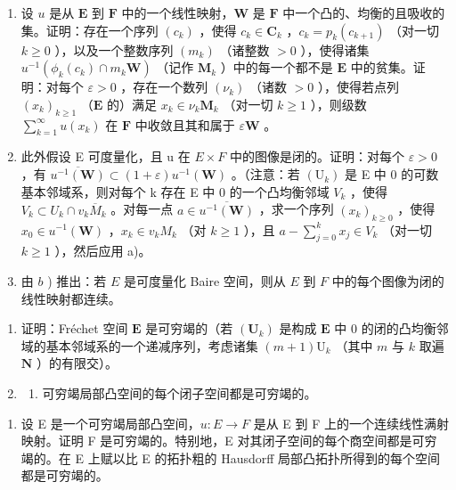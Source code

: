 \begin{enumerate}
\def\labelenumi{\alph{enumi})}
\item
  设 \(u\) 是从 \(\mathbf{E}\) 到 \(\mathbf{F}\) 中的一个线性映射，\(\mathbf{W}\) 是 \(\mathbf{F}\) 中一个凸的、均衡的且吸收的集。证明：存在一个序列 \((c_k)\) ，使得 \(c_k \in \mathbf{C}_k\) ，\(c_k = p_k(c_{k+1})\) （对一切 \(k \geqslant 0\) ），以及一个整数序列 \((m_k)\) （诸整数 \(> 0\) ），使得诸集 \(u^{-1}(\phi_k(c_k) \cap m_k\mathbf{W})\) （记作 \(\mathbf{M}_k\) ）中的每一个都不是 \(\mathbf{E}\) 中的贫集。证明：对每个 \(\varepsilon > 0\) ，存在一个数列 \((\nu_k)\) （诸数 \(> 0\) ），使得若点列 \((x_k)_{k \geqslant 1}\) （\(\mathbf{E}\) 的）满足 \(x_k \in \nu_k\mathbf{M}_k\) （对一切 \(k \geqslant 1\) ），则级数 \(\sum_{k=1}^{\infty} u(x_k)\) 在 \(\mathbf{F}\) 中收敛且其和属于 \(\varepsilon\mathbf{W}\) 。
\item
  此外假设 E 可度量化，且 u 在 \(E \times F\) 中的图像是闭的。证明：对每个 \(\varepsilon > 0\) ，有 \(\overline{u^{-1}(\mathbf{W})} \subset (1 + \varepsilon) u^{-1}(\mathbf{W})\) 。（注意：若 \((\mathrm{U}_{k})\) 是 E 中 0 的可数基本邻域系，则对每个 k 存在 E 中 0 的一个凸均衡邻域 \(V_{k}\) ，使得 \(V_{k} \subset U_{k} \cap v_{k} \overline{M}_{k}\) 。对每一点 \(a \in \overline{u^{-1}(\mathbf{W})}\) ，求一个序列 \((x_{k})_{k \geqslant 0}\) ，使得 \(x_{0} \in u^{-1}(\mathbf{W})\) ，\(x_{k} \in v_{k} M_{k}\) （对 \(k \geqslant 1\) ），且 \(a - \sum_{j=0}^{k} x_{j} \in V_{k}\) （对一切 \(k \geqslant 1\) ），然后应用 a)。
\item
  由 \(b\) ) 推出：若 \(E\) 是可度量化 Baire 空间，则从 \(E\) 到 \(F\) 中的每个图像为闭的线性映射都连续。
\end{enumerate}

\begin{enumerate}
\def\labelenumi{\arabic{enumi})}
\setcounter{enumi}{2}
\item
  证明：Fréchet 空间 \(\mathbf{E}\) 是可穷竭的（若 \((\mathbf{U}_k)\) 是构成 \(\mathbf{E}\) 中 0 的闭的凸均衡邻域的基本邻域系的一个递减序列，考虑诸集 \((m + 1)\mathrm{U}_k\) （其中 \(m\) 与 \(k\) 取遍 \(\mathbf{N}\) ）的有限交）。
\item
  \begin{enumerate}
  \def\labelenumii{\alph{enumii})}
  \tightlist
  \item
    可穷竭局部凸空间的每个闭子空间都是可穷竭的。
  \end{enumerate}
\end{enumerate}

\begin{enumerate}
\def\labelenumi{\alph{enumi})}
\setcounter{enumi}{1}
\tightlist
\item
  设 E 是一个可穷竭局部凸空间，\(u:E \rightarrow F\) 是从 E 到 F 上的一个连续线性满射映射。证明 F 是可穷竭的。特别地，E 对其闭子空间的每个商空间都是可穷竭的。在 E 上赋以比 E 的拓扑粗的 Hausdorff 局部凸拓扑所得到的每个空间都是可穷竭的。
\end{enumerate}

